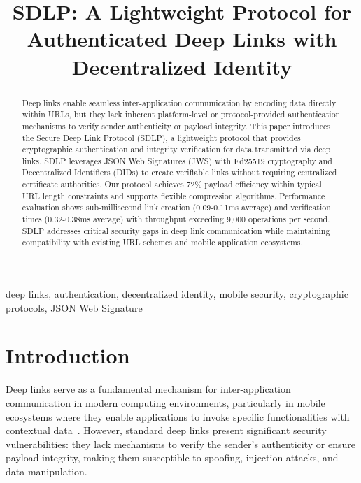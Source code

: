 \documentclass[conference]{IEEEtran}
\begin{document}
\title{SDLP: A Lightweight Protocol for Authenticated Deep Links with Decentralized Identity}

\author{
}

\maketitle

\begin{abstract}
Deep links enable seamless inter-application communication by encoding data directly within URLs, but they lack inherent platform-level or protocol-provided authentication mechanisms to verify sender authenticity or payload integrity. This paper introduces the Secure Deep Link Protocol (SDLP), a lightweight protocol that provides cryptographic authentication and integrity verification for data transmitted via deep links. SDLP leverages JSON Web Signatures (JWS) with Ed25519 cryptography and Decentralized Identifiers (DIDs) to create verifiable links without requiring centralized certificate authorities. Our protocol achieves 72\% payload efficiency within typical URL length constraints and supports flexible compression algorithms. Performance evaluation shows sub-millisecond link creation (0.09-0.11ms average) and verification times (0.32-0.38ms average) with throughput exceeding 9,000 operations per second. SDLP addresses critical security gaps in deep link communication while maintaining compatibility with existing URL schemes and mobile application ecosystems.
\end{abstract}

\begin{IEEEkeywords}
deep links, authentication, decentralized identity, mobile security, cryptographic protocols, JSON Web Signature
\end{IEEEkeywords}

\section{Introduction}

Deep links serve as a fundamental mechanism for inter-application communication in modern computing environments, particularly in mobile ecosystems where they enable applications to invoke specific functionalities with contextual data~\cite{android-app-links, ios-universal-links}. However, standard deep links present significant security vulnerabilities: they lack mechanisms to verify the sender's authenticity or ensure payload integrity, making them susceptible to spoofing, injection attacks, and data manipulation.
\end{document}

